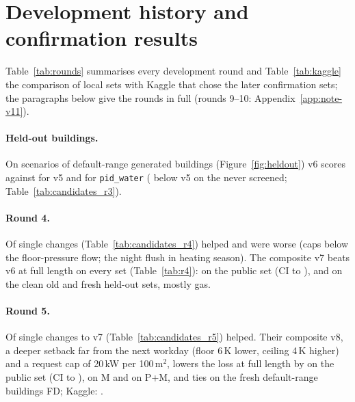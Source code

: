 \documentclass{article}
\begin{document}
\section{Development history and confirmation results}
\label{app:rounds}
Table~\ref{tab:rounds} summarises every development round and Table~\ref{tab:kaggle} the comparison of local sets with Kaggle that chose the later confirmation sets; the paragraphs below give the rounds in full (rounds 9--10: Appendix~\ref{app:note-v11}).



\paragraph{Held-out buildings.}
On \NHeldAll{} scenarios of \NHeldAllBuild{} default-range generated buildings (Figure~\ref{fig:heldout}) v6 scores
\HeldAllMetricOurs{} against \HeldAllMetricOursVFive{} for v5 and \HeldAllMetricPidWater{} for \texttt{pid\_water}
(\HeldUnscrVFiveRelRed{} below v5 on the \NHeldUnscr{} never screened; Table~\ref{tab:candidates_r3}).

\paragraph{Round 4.}
Of \RFNSingles{} single changes (Table~\ref{tab:candidates_r4}) \RFNHelps{} helped and \RFNWorse{} were worse (caps
below the floor-pressure flow; the night flush in heating season). The composite v7 beats v6 at full length on every
set (Table~\ref{tab:r4}): \RFConfPubRed{} on the public set (CI \RFConfPubRedLo{} to \RFConfPubRedHi),
\RFConfOldCleanRed{} and \RFConfFreshRed{} on the clean old and fresh held-out sets, mostly gas.

\paragraph{Round 5.}
Of \RFiveNSingles{} single changes to v7 (Table~\ref{tab:candidates_r5}) \RFiveNHelps{} helped. Their composite v8, a
deeper setback far from the next workday (floor 6\,K lower, ceiling 4\,K higher) and a request cap of 20\,kW per
100\,m$^2$, lowers the loss at full length by
\RFiveConfPubRelAbs{} on the public set (CI \RFiveConfPubRelHiAbs{} to \RFiveConfPubRelLoAbs), \RFiveConfMinnRelAbs{} on
M and \RFiveConfPubMinnRelAbs{} on P+M, and ties on the fresh default-range buildings FD; Kaggle: \RFiveKagVEight.
\end{document}
